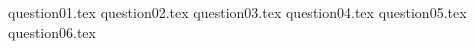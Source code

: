 \documentclass[french, 12pt]{article}
\newcommand{\<}[1]{\\\hspace*{-\indentationFormule}\makebox(0,0)[bl]{$#1$}\hspace*{\indentationFormule}}
\begin{document}

\pagebreak
{question01.tex}
\pagebreak
{question02.tex}
\pagebreak
{question03.tex}
\pagebreak
{question04.tex}
\pagebreak
{question05.tex}
\pagebreak
{question06.tex}
\end{document}
